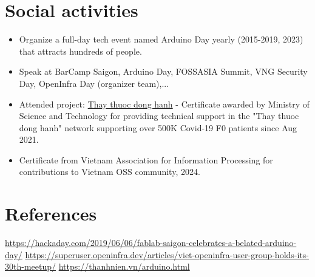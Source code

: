 \documentclass[letterpaper,11pt]{article}
\newcommand{\resumeItemNornal}[1]{
  \item\small{
    {#1 \vspace{-2pt}}
  }
}
\newcommand{\resumeSubItemNormal}[1]{\resumeItemNornal{#1}\vspace{-4pt}}
\newcommand{\resumeSubHeadingListStart}{\begin{itemize}[leftmargin=*]}
\newcommand{\resumeSubHeadingListEnd}{\end{itemize}}
\begin{document}
\section{Social activities}
  \resumeSubHeadingListStart
    \resumeSubItemNormal
      {Organize a full-day tech event named Arduino Day yearly (2015-2019, 2023) that attracts hundreds of people.}
    \resumeSubItemNormal
      {Speak at BarCamp Saigon, Arduino Day, FOSSASIA Summit, VNG Security Day, OpenInfra Day (organizer team),...}
    \resumeSubItemNormal
      {Attended project: \href{https://thaythuocdonghanh.vn}{Thay thuoc dong hanh} - Certificate awarded by Ministry of Science and Technology for providing technical support in the "Thay thuoc dong hanh" network supporting over 500K Covid-19 F0 patients since Aug 2021.}
    \resumeSubItemNormal
    {Certificate from Vietnam Association for Information Processing for contributions to Vietnam OSS community, 2024.}
\resumeSubHeadingListEnd

\section{References}
    \small{\href{https://hackaday.com/2019/06/06/fablab-saigon-celebrates-a-belated-arduino-day/}{https://hackaday.com/2019/06/06/fablab-saigon-celebrates-a-belated-arduino-day/}}
    \small{\href{https://superuser.openinfra.dev/articles/viet-openinfra-user-group-holds-its-30th-meetup/}{https://superuser.openinfra.dev/articles/viet-openinfra-user-group-holds-its-30th-meetup/}}\newline
    \small{\href{https://thanhnien.vn/vi-sao-nhieu-nguoi-me-arduino-nen-tang-duoc-cho-la-tien-than-cua-giao-duc-stem-185230704165819482.htm}{https://thanhnien.vn/arduino.html}}
   
\end{document}
